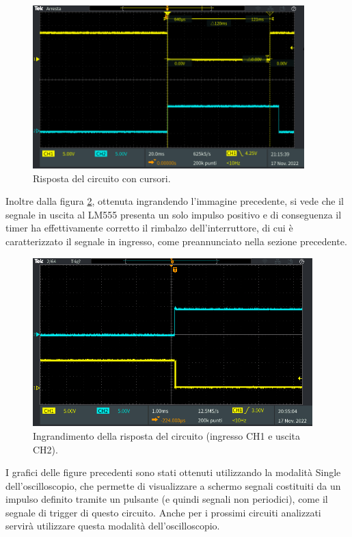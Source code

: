 \documentclass{report}
\begin{document}
\begin{figure}[h!]
	\centering
	\includegraphics[height=6.3cm]{immagini/TEK00010}
	\caption{Risposta del circuito con cursori.}
	\label{figura:TEK00010}
\end{figure}

\noindent Inoltre dalla figura \ref{figura:TEK00009}, ottenuta ingrandendo l'immagine precedente, si vede che il segnale in uscita al LM555 presenta un solo impulso positivo e di conseguenza il timer ha effettivamente corretto il rimbalzo dell'interruttore, di cui è caratterizzato il segnale in ingresso, come preannunciato nella sezione precedente.

\begin{figure}[h!]
	\centering
	\includegraphics[height=6.5cm]{immagini/TEK00009}
	\caption{Ingrandimento della risposta del circuito (ingresso CH1 e uscita CH2).}
	\label{figura:TEK00009}
\end{figure}

\noindent I grafici delle figure precedenti sono stati ottenuti utilizzando la modalità Single dell'oscilloscopio, che permette di visualizzare a schermo segnali costituiti da un impulso definito tramite un pulsante (e quindi segnali non periodici), come il segnale di trigger di questo circuito. Anche per i prossimi circuiti analizzati servirà utilizzare questa modalità dell'oscilloscopio.
\end{document}
